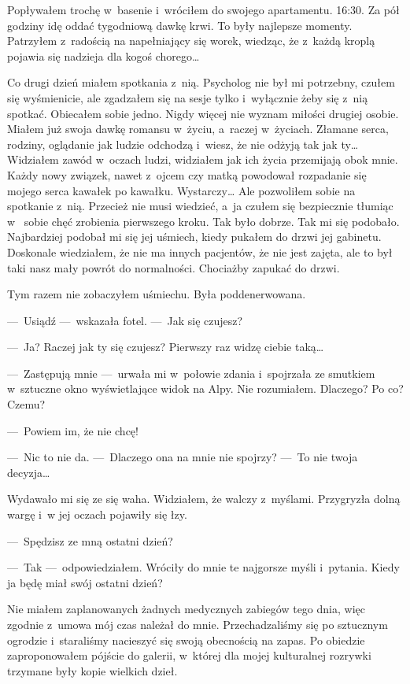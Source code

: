 Popływałem trochę w~basenie i~wróciłem do swojego apartamentu. 16:30. Za pół godziny idę oddać tygodniową dawkę krwi. 
To były najlepsze momenty. Patrzyłem z~radością na napełniający się worek, wiedząc, że z~każdą kroplą pojawia się 
nadzieja dla kogoś chorego…

Co drugi dzień miałem spotkania z~nią. Psycholog nie był mi potrzebny, czułem się wyśmienicie, ale zgadzałem się na 
sesje tylko i~wyłącznie żeby się z~nią spotkać. Obiecałem sobie jedno. Nigdy więcej nie wyznam miłości drugiej 
osobie. Miałem już swoja dawkę romansu w~życiu, a~raczej w~życiach. Złamane serca, rodziny, oglądanie jak ludzie 
odchodzą i~wiesz, że nie odżyją tak jak ty… Widziałem zawód w~oczach ludzi, widziałem jak ich życia przemijają obok 
mnie. Każdy nowy związek, nawet z~ojcem czy matką powodował rozpadanie się mojego serca kawałek po kawałku. 
Wystarczy… Ale pozwoliłem sobie na spotkanie z~nią. Przecież nie musi wiedzieć, a~ja czułem się bezpiecznie tłumiąc w~
sobie chęć zrobienia pierwszego kroku. Tak było dobrze. Tak mi się podobało. Najbardziej podobał mi się jej uśmiech, 
kiedy pukałem do drzwi jej gabinetu. Doskonale wiedziałem, że nie ma innych pacjentów, że nie jest zajęta, ale to był 
taki nasz mały powrót do normalności. Chociażby zapukać do drzwi. 

Tym razem nie zobaczyłem uśmiechu. Była poddenerwowana. 

---~Usiądź ---~wskazała fotel. ---~Jak się czujesz?

---~Ja? Raczej jak ty się czujesz? Pierwszy raz widzę ciebie taką…

---~Zastępują mnie ---~urwała mi w~połowie zdania i~spojrzała ze smutkiem w~sztuczne okno wyświetlające widok na Alpy. 
Nie rozumiałem. Dlaczego? Po co? Czemu?

---~Powiem im, że nie chcę! 

---~Nic to nie da. ---~Dlaczego ona na mnie nie spojrzy? ---~To nie twoja decyzja…

Wydawało mi się ze się waha. Widziałem, że walczy z~myślami. Przygryzła dolną wargę i~w jej oczach pojawiły się łzy. 

---~Spędzisz ze mną ostatni dzień?

---~Tak ---~odpowiedziałem. Wróciły do mnie te najgorsze myśli i~pytania. Kiedy ja będę miał swój ostatni dzień?

Nie miałem zaplanowanych żadnych medycznych zabiegów tego dnia, więc zgodnie z~umowa mój czas należał do mnie. 
Przechadzaliśmy się po sztucznym ogrodzie i~staraliśmy nacieszyć się swoją obecnością na zapas. Po obiedzie 
zaproponowałem pójście do galerii, w~której dla mojej kulturalnej rozrywki trzymane były kopie wielkich dzieł.

